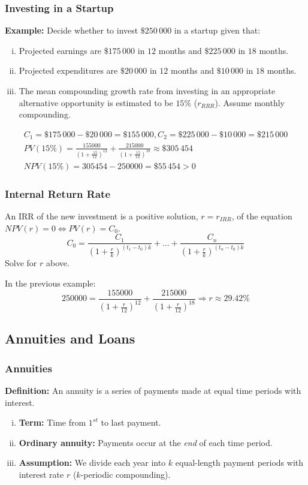 \subsubsection{Investing in a Startup}
\textbf{Example: } Decide whether to invest \(\$250\,000\) in a startup given that:
\begin{enumerate}[i.]
    \item Projected earnings are \(\$175\,000\) in \(12\) months and \(\$225 \,000\) in \(18\) months.
    \item Projected expenditures are \(\$20\,000\) in \(12\) months and \(\$10\,000\) in \(18\) months.
    \item The mean compounding growth rate from investing in an appropriate alternative opportunity is estimated to be \(15\%\) (\(r_{RRR}\)). Assume monthly compounding.
\end{enumerate}
\begin{gather*}
    C_1 = \$175\,000 - \$20\,000 = \$155\,000, C_2= \$225\,000 - \$10\,000 = \$215\,000 \\
    PV(15\%) = \frac{155000}{(1+\frac{.15}{12})^{12}} + \frac{215000}{(1+\frac{.15}{12})^{18}} \approx \$305\,454 \\
    NPV(15\%) = 305454 - 250000 = \$55\,454 > 0
\end{gather*}

\subsubsection{Internal Return Rate}
An IRR of the new investment is a positive solution, \(r = r_{IRR}\), of the equation \(NPV(r)=0 \Leftrightarrow PV(r) = C_0\).
\begin{equation*}
    C_0 = \frac{C_1}{(1+\frac{r}{k})^{(t_1-t_0)k}} + \dots + \frac{C_n}{(1+\frac{r}{k})^{(t_n-t_0)k}}
\end{equation*}
Solve for \(r\) above.

In the previous example:
\begin{equation*}
    250000 = \frac{155000}{(1+\frac{r}{12})^{12}} + \frac{215000}{(1+\frac{r}{12})^{18}} \Rightarrow r \approx 29.42\%
\end{equation*}

\subsection{Annuities and Loans}

\subsubsection{Annuities}
\textbf{Definition:} An annuity is a series of payments made at equal time periods with interest.
\begin{enumerate}[i.]
    \item \textbf{Term:} Time from $1^{st}$ to last payment.
    \item \textbf{Ordinary annuity:} Payments occur at the \textit{end} of each time period.
    \item \textbf{Assumption:} We divide each year into $k$ equal-length payment periods with interest rate $r$ ($k$-periodic compounding).
\end{enumerate}

